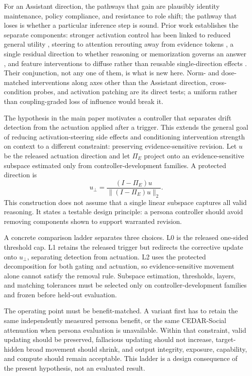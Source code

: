 \documentclass[letterpaper]{article}
\begin{document}
For an Assistant direction, the pathways that gain are plausibly identity maintenance, policy compliance, and resistance to role shift; the pathway that loses is whether a particular inference step is sound. Prior work establishes the separate components: stronger activation control has been linked to reduced general utility \citep{xu2026steering}, steering to attention rerouting away from evidence tokens \citep{luo2026focus}, a single residual direction to whether reasoning or memorization governs an answer \citep{hong2025reasoning}, and feature interventions to diffuse rather than reusable single-direction effects \citep{hoang2026sae}. Their conjunction, not any one of them, is what is new here. Norm- and dose-matched interventions along axes other than the Assistant direction, cross-condition probes, and activation patching are its direct tests; a uniform rather than coupling-graded loss of influence would break it.

The hypothesis in the main paper motivates a controller that separates drift detection from the actuation applied after a trigger.  This extends the general goal of reducing activation-steering side effects and conditioning intervention strength on context \citep{stickland2024steering,lee2025programming} to a different constraint: preserving evidence-sensitive revision.  Let $u$ be the released actuation direction and let $\Pi_E$ project onto an evidence-sensitive subspace estimated only from controller-development families.  A protected direction is
\begin{equation}
u_{\perp}=\frac{(I-\Pi_E)u}{\lVert(I-\Pi_E)u\rVert_2}.
\end{equation}
This construction does not assume that a single linear subspace captures all valid reasoning.  It states a testable design principle: a persona controller should avoid removing components shown to support warranted revision.

A concrete comparison ladder separates three choices.  L0 is the released one-sided threshold cap.  L1 retains the released trigger but redirects the corrective update onto $u_{\perp}$, separating detection from actuation.  L2 uses the protected decomposition for both gating and actuation, so evidence-sensitive movement alone cannot satisfy the removal rule.  Subspace estimation, thresholds, layers, and matching tolerances must be selected only on controller-development families and frozen before held-out evaluation.

The operating point must be benefit-matched.  A variant first has to retain the same independently measured persona benefit, or the same CEDAR-Social attenuation when persona evaluation is unavailable.  Within that constraint, valid updating should be preserved, fallacious updating should not increase, target-hidden broad movement should shrink, and output integrity, exposure, capability, and compute should remain acceptable.  This ladder is a design consequence of the present hypothesis, not an evaluated result.
\end{document}
